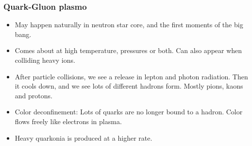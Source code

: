 \documentclass{article}
\begin{document}
\subsubsection{Quark-Gluon plasmo}
\begin{itemize}
    \item May happen naturally in neutron star core, and the first moments of the big bang.  
    \item Comes about at high temperature, pressures or both. Can also appear when colliding heavy ions. 
    \item After particle collisions, we see a release in lepton and photon radiation. Then it cools down, and we see lots of different hadrons form. Mostly pions, kaons and protons. 
    \item Color deconfinement: Lots of quarks are no longer bound to a hadron. Color flows freely like electrons in plasma. 
    \item Heavy quarkonia is produced at a higher rate. 
\end{itemize}
\end{document}

